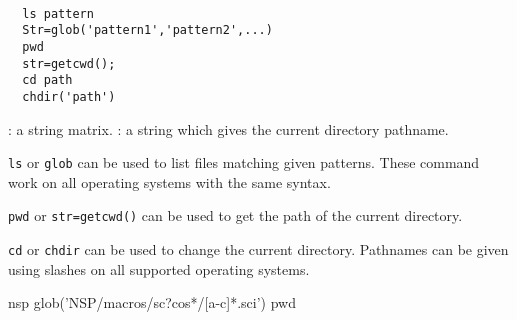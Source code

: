 \begin{mandesc}
   \\ %
   \\ %
   \\ %
   \\ %
   \\ %
   \\ %
\end{mandesc}
\begin{calling_sequence}
\begin{verbatim}
  ls pattern 
  Str=glob('pattern1','pattern2',...)
  pwd  
  str=getcwd();
  cd path 
  chdir('path')
\end{verbatim}
\end{calling_sequence}
\begin{parameters}
  \begin{varlist}
    : a string matrix. 
    : a string which gives the current directory pathname.
  \end{varlist}
\end{parameters}
\begin{mandescription}
  \verb!ls! or \verb!glob! can be used to list files matching 
  given patterns. These command work on all operating systems 
  with the same syntax. 

\noindent  \verb!pwd! or \verb!str=getcwd()! can be used to get the 
  path of the current directory. 

\noindent  \verb!cd! or \verb!chdir! can be used to change the current 
  directory. Pathnames can be given using slashes on all 
  supported operating systems. 
\end{mandescription}
\begin{examples}
  \begin{mintednsp}{nsp}
    glob('NSP/macros/sc?cos*/[a-c]*.sci')
    pwd 
  \end{mintednsp}
\end{examples}
\begin{manseealso}
\end{manseealso}
